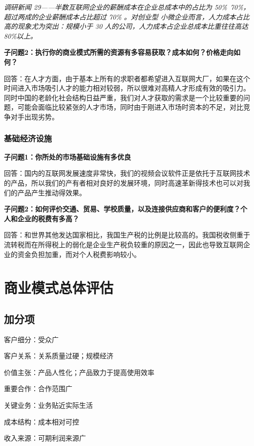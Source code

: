 \documentclass[a4paper,12pt]{article}
\begin{document}
    \textit{调研新闻 29——半数互联⽹企业的薪酬成本在企业总成本中的占⽐为 50\%~70\%，超过两成的企业薪酬成本占⽐超过 70\% 。对创业型 ⼩微企业⽽⾔，⼈⼒成本占⽐⾼的现象尤为突出：规模⼩于 30 ⼈的公司，⼈⼒成本占企业总成本⽐重往往⾼达 80\%以上。}

    \textit{}

    \textbf{子问题2：执行你的商业模式所需的资源有多容易获取？成本如何？价格走向如何？}

    回答：在⼈才⽅⾯，由于基本上所有的求职者都希望进⼊互联⽹⼤⼚，如果在这个时间进⼊市场吸引⼈才的能⼒相对较弱，所以很难对⾼精⼈才形成有效的吸引⼒。同时中国的⽼龄化社会结构⽇益严重，我们对⼈才获取的需求是⼀个⽐较重要的问题，可能会⾯临⽐较紧张的⼈才市场，同时由于刚进⼊市场时资本的不⾜，对⽐竞争对⼿出现劣势。

    \subsubsection{基础经济设施}
    \textbf{子问题1：你所处的市场基础设施有多优良}

    回答：国内的互联⽹发展速度⾮常快，我们的视频会议软件正是依托于互联⽹技术的产品，所以我们的产有者相对良好的发展环境，同时⾼速⾰新得技术也可以对我们的产品产⽣推动得效果。

    \textbf{子问题2：如何评价交通、贸易、学校质量，以及连接供应商和客户的便利度？个人和企业的税费有多高？}

    回答：和世界其他发达国家相⽐，我国⽣产税的⽐例是⽐较⾼的。我国税收侧重于流转税⽽在所得税上的弱化是企业⽣产税负较重的原因之⼀，因此也导致互联⽹企业的资⾦负担加重，⽽对个⼈税费影响较⼩。

    \section{商业模式总体评估}
    \subsection{加分项}
    客户细分：受众⼴
    
    客户关系：关系质量过硬；规模经济
    
    价值主张：产品⼈性化；产品致⼒于提⾼使⽤效率
    
    重要合作：合作范围⼴
    
    关键业务：业务贴近实际⽣活
    
    成本结构：成本相对可控
    
    收⼊来源：可期利润来源⼴
    
\end{document}
